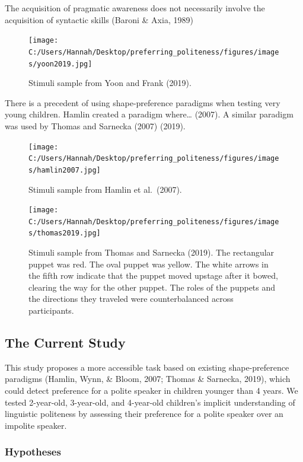 \documentclass[
  english,
  man,floatsintext]{apa6}
\begin{document}
The acquisition of pragmatic awareness does not necessarily involve the acquisition of syntactic skills (Baroni \& Axia, 1989)

\begin{figure}
\centering
\texttt{[image: C:/Users/Hannah/Desktop/preferring\_politeness/figures/images/yoon2019.jpg]}
\caption{Stimuli sample from Yoon and Frank (2019).}
\end{figure}

There is a precedent of using shape-preference paradigms when testing very young children. Hamlin created a paradigm where\ldots{} (2007). A similar paradigm was used by Thomas and Sarnecka (2007) (2019).

\begin{figure}
\centering
\texttt{[image: C:/Users/Hannah/Desktop/preferring\_politeness/figures/images/hamlin2007.jpg]}
\caption{Stimuli sample from Hamlin et al.~(2007).}
\end{figure}

\begin{figure}
\centering
\texttt{[image: C:/Users/Hannah/Desktop/preferring\_politeness/figures/images/thomas2019.jpg]}
\caption{Stimuli sample from Thomas and Sarnecka (2019). The rectangular puppet was red. The oval puppet was yellow. The white arrows in the fifth row indicate that the puppet moved upstage after it bowed, clearing the way for the other puppet. The roles of the puppets and the directions they traveled were counterbalanced across participants.}
\end{figure}

\hypertarget{the-current-study}{%
\subsection{The Current Study}\label{the-current-study}}

This study proposes a more accessible task based on existing shape-preference paradigms (Hamlin, Wynn, \& Bloom, 2007; Thomas \& Sarnecka, 2019), which could detect preference for a polite speaker in children younger than 4 years. We tested 2-year-old, 3-year-old, and 4-year-old children's implicit understanding of linguistic politeness by assessing their preference for a polite speaker over an impolite speaker.

\hypertarget{hypotheses}{%
\subsubsection{Hypotheses}\label{hypotheses}}
\end{document}
